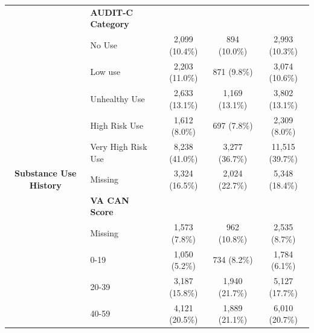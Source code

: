 \documentclass[useAMS,referee, usegraphicx]{biom}
\begin{document}
\begin{table}[H]
\begin{tabular}{clccc}
                                                    & { \textbf{AUDIT-C Category}} &                                                      &                                                     &                                                       \\
                                                    & { No Use}                                  & { 2,099 (10.4\%)}  & { 894 (10.0\%)}   & { 2,993 (10.3\%)}   \\
                                                    & { Low use}                                 & { 2,203 (11.0\%)}  & { 871 (9.8\%)}    & { 3,074 (10.6\%)}   \\
                                                    & { Unhealthy Use}                           & { 2,633 (13.1\%)}  & { 1,169 (13.1\%)} & { 3,802 (13.1\%)}   \\
                                                    & { High Risk Use}                           & { 1,612 (8.0\%)}   & { 697 (7.8\%)}    & { 2,309 (8.0\%)}    \\
                                                    & { Very High Risk Use}                      & { 8,238 (41.0\%)}  & { 3,277 (36.7\%)} & { 11,515 (39.7\%)}  \\
\multirow{-13}{*}{\textbf{Substance Use History}}   & { Missing}                                 & { 3,324 (16.5\%)}  & { 2,024 (22.7\%)} & { 5,348 (18.4\%)}   \\ \midrule
                                                    & { \textbf{VA CAN Score}}                   &                                                      &                                                     &                                                       \\
                                                    & { Missing}                                 & { 1,573 (7.8\%)}   & { 962 (10.8\%)}   & { 2,535 (8.7\%)}    \\
                                                    & { 0-19}                                    & { 1,050 (5.2\%)}   & { 734 (8.2\%)}    & { 1,784 (6.1\%)}    \\
                                                    & { 20-39}                                   & { 3,187 (15.8\%)}  & { 1,940 (21.7\%)} & { 5,127 (17.7\%)}   \\
                                                    & { 40-59}                                   & { 4,121 (20.5\%)}  & { 1,889 (21.1\%)} & { 6,010 (20.7\%)}   \\

\end{tabular}
\end{table}
\end{document}
